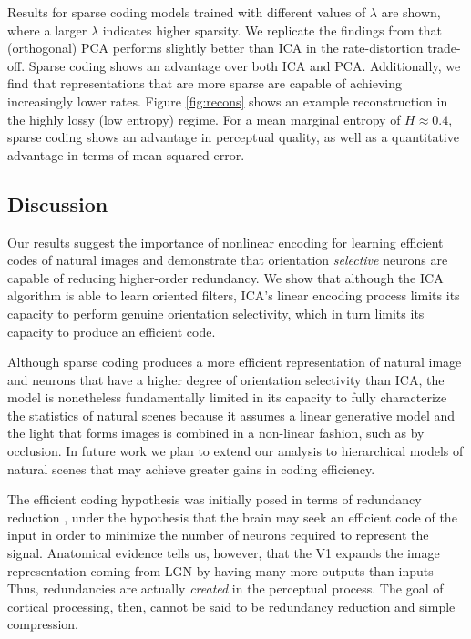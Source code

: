 Results for sparse coding models trained with different values of $\lambda$ are shown, where a larger $\lambda$ indicates higher sparsity. We replicate the findings from  that (orthogonal) PCA  performs slightly better than ICA in the rate-distortion trade-off. Sparse coding shows an advantage over both ICA and PCA. Additionally, we find that representations that are more sparse are capable of achieving increasingly lower rates.
Figure \ref{fig:recons} shows an example reconstruction in the highly lossy (low entropy) regime. For a mean marginal entropy of $H\approx 0.4$, sparse coding shows an advantage in perceptual quality, as well as a quantitative advantage in terms of mean squared error.



\subsection{Discussion}
Our results suggest the importance of nonlinear encoding for learning efficient codes of natural images and demonstrate that orientation \textit{selective} neurons are capable of reducing higher-order redundancy. We show that although the ICA algorithm is able to learn oriented filters, ICA's linear encoding process limits its capacity to perform genuine orientation selectivity, which in turn limits its capacity to produce an efficient code. 

Although sparse coding produces a more efficient representation of natural image and neurons that have a higher degree of orientation selectivity than ICA, the model is nonetheless fundamentally limited in its capacity to fully characterize the statistics of natural scenes because it assumes a linear generative model and the light that forms images is combined in a non-linear fashion, such as by occlusion. In future work we plan to extend our analysis to hierarchical models of natural scenes that may achieve greater gains in coding efficiency.

The efficient coding hypothesis was initially posed in terms of redundancy reduction \cite{barlow1961possible}, under the hypothesis that the brain may seek an efficient code of the input in order to minimize the number of neurons required to represent the signal. Anatomical evidence tells us, however, that the V1 expands the image representation coming from LGN by having many more outputs than inputs \cite{olshausen2003principles} Thus, redundancies are actually \textit{created} in the perceptual process. The goal of cortical processing, then, cannot be said to be redundancy reduction and simple compression.

